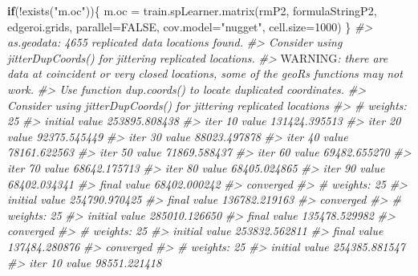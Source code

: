 \documentclass[
  graybox,natbib,nospthms]{svmono}
\newenvironment{Shaded}{\begin{snugshade}}{\end{snugshade}}
\newcommand{\AlertTok}[1]{\textcolor[rgb]{0.33,0.33,0.33}{#1}}
\newcommand{\AttributeTok}[1]{\textcolor[rgb]{0.61,0.61,0.61}{#1}}
\newcommand{\CommentTok}[1]{\textcolor[rgb]{0.37,0.37,0.37}{\textit{#1}}}
\newcommand{\ConstantTok}[1]{\textcolor[rgb]{0,0,0}{#1}}
\newcommand{\ControlFlowTok}[1]{\textcolor[rgb]{0.27,0.27,0.27}{\textbf{#1}}}
\newcommand{\DecValTok}[1]{\textcolor[rgb]{0.06,0.06,0.06}{#1}}
\newcommand{\FunctionTok}[1]{\textcolor[rgb]{0,0,0}{#1}}
\newcommand{\NormalTok}[1]{#1}
\newcommand{\OtherTok}[1]{\textcolor[rgb]{0.37,0.37,0.37}{#1}}
\newcommand{\SpecialCharTok}[1]{\textcolor[rgb]{0,0,0}{#1}}
\newcommand{\StringTok}[1]{\textcolor[rgb]{0.5,0.5,0.5}{#1}}
\begin{document}
\begin{Shaded}
\begin{Highlighting}[]
\ControlFlowTok{if}\NormalTok{(}\SpecialCharTok{!}\FunctionTok{exists}\NormalTok{(}\StringTok{"m.oc"}\NormalTok{))\{}
\NormalTok{  m.oc }\OtherTok{=} \FunctionTok{train.spLearner.matrix}\NormalTok{(rmP2, formulaStringP2, edgeroi.grids, }
                        \AttributeTok{parallel=}\ConstantTok{FALSE}\NormalTok{, }\AttributeTok{cov.model=}\StringTok{"nugget"}\NormalTok{, }\AttributeTok{cell.size=}\DecValTok{1000}\NormalTok{)}
\NormalTok{\}}
\CommentTok{\#\textgreater{} as.geodata: 4655 replicated data locations found. }
\CommentTok{\#\textgreater{}  Consider using jitterDupCoords() for jittering replicated locations. }
\CommentTok{\#\textgreater{} }\AlertTok{WARNING}\CommentTok{: there are data at coincident or very closed locations, some of the geoR\textquotesingle{}s functions may not work.}
\CommentTok{\#\textgreater{}  Use function dup.coords() to locate duplicated coordinates.}
\CommentTok{\#\textgreater{}  Consider using jitterDupCoords() for jittering replicated locations }
\CommentTok{\#\textgreater{} \# weights:  25}
\CommentTok{\#\textgreater{} initial  value 253895.808438 }
\CommentTok{\#\textgreater{} iter  10 value 131424.395513}
\CommentTok{\#\textgreater{} iter  20 value 92375.545449}
\CommentTok{\#\textgreater{} iter  30 value 88023.497878}
\CommentTok{\#\textgreater{} iter  40 value 78161.622563}
\CommentTok{\#\textgreater{} iter  50 value 71869.588437}
\CommentTok{\#\textgreater{} iter  60 value 69482.655270}
\CommentTok{\#\textgreater{} iter  70 value 68642.175713}
\CommentTok{\#\textgreater{} iter  80 value 68405.024865}
\CommentTok{\#\textgreater{} iter  90 value 68402.034341}
\CommentTok{\#\textgreater{} final  value 68402.000242 }
\CommentTok{\#\textgreater{} converged}
\CommentTok{\#\textgreater{} \# weights:  25}
\CommentTok{\#\textgreater{} initial  value 254790.970425 }
\CommentTok{\#\textgreater{} final  value 136782.219163 }
\CommentTok{\#\textgreater{} converged}
\CommentTok{\#\textgreater{} \# weights:  25}
\CommentTok{\#\textgreater{} initial  value 285010.126650 }
\CommentTok{\#\textgreater{} final  value 135478.529982 }
\CommentTok{\#\textgreater{} converged}
\CommentTok{\#\textgreater{} \# weights:  25}
\CommentTok{\#\textgreater{} initial  value 253832.562811 }
\CommentTok{\#\textgreater{} final  value 137484.280876 }
\CommentTok{\#\textgreater{} converged}
\CommentTok{\#\textgreater{} \# weights:  25}
\CommentTok{\#\textgreater{} initial  value 254385.881547 }
\CommentTok{\#\textgreater{} iter  10 value 98551.221418}

\end{Highlighting}
\end{Shaded}
\end{document}
